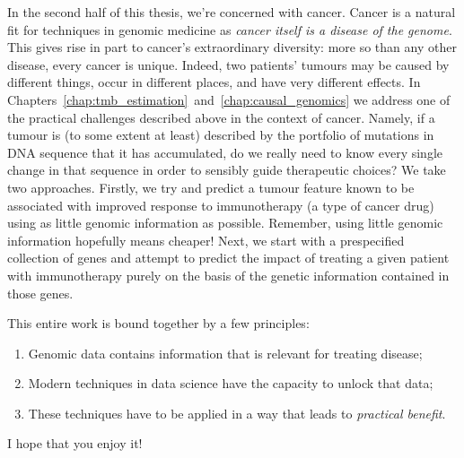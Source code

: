 \documentclass[../thesis.tex]{subfiles}
\begin{document}
In the second half of this thesis, we're concerned with cancer. Cancer is a natural fit for techniques in genomic medicine as \emph{cancer itself is a disease of the genome}. This gives rise in part to cancer's extraordinary diversity: more so than any other disease, every cancer is unique. Indeed, two patients’ tumours may be caused by different things, occur in different places, and have very different effects. In Chapters~\ref{chap:tmb_estimation}~and~\ref{chap:causal_genomics} we address one of the practical challenges described above in the context of cancer. Namely, if a tumour is (to some extent at least) described by the portfolio of mutations in DNA sequence that it has accumulated, do we really need to know every single change in that sequence in order to sensibly guide therapeutic choices? We take two approaches. Firstly, we try and predict a tumour feature known to be associated with improved response to immunotherapy (a type of cancer drug) using as little genomic information as possible. Remember, using little genomic information hopefully means cheaper! Next, we start with a prespecified collection of genes and attempt to predict the impact of treating a given patient with immunotherapy purely on the basis of the genetic information contained in those genes.

This entire work is bound together by a few principles:
\begin{enumerate}
    \item Genomic data contains information that is relevant for treating disease;
    \item Modern techniques in data science have the capacity to unlock that data;
    \item These techniques have to be applied in a way that leads to \emph{practical benefit}.
\end{enumerate}
I hope that you enjoy it!

\end{document}
